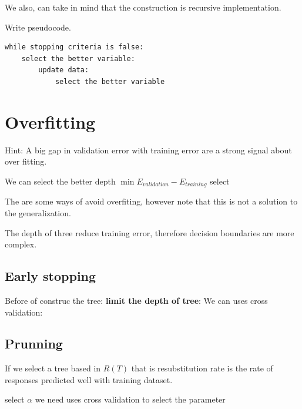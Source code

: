 \documentclass[10pt,a4paper]{article}
\begin{document}
We also, can take in mind that the construction is recursive implementation.

Write pseudocode.

\begin{lstlisting}
while stopping criteria is false:
	select the better variable:
		update data:
			select the better variable
\end{lstlisting}


\section{Overfitting}


Hint: A big gap in validation error with training error are a strong signal about over fitting.

We can select the better depth 
$ \min  E_{validation}  - E_{training}$  select 


The are some ways of avoid overfiting, however note that this is not a solution to the generalization.




The depth of three reduce training error, therefore decision boundaries are more complex.

\subsection{Early stopping}

Before of construc the tree:
\textbf{limit the depth of tree}:
We can uses cross validation:








\subsection{Prunning}

If we select a tree based in $R(T)$ that is 
resubstitution rate is the rate of responses predicted well with training dataset. 


select $\alpha$ we need uses cross validation to select the parameter

\begin{algorithm}[H]

\end{algorithm}
\end{document}
